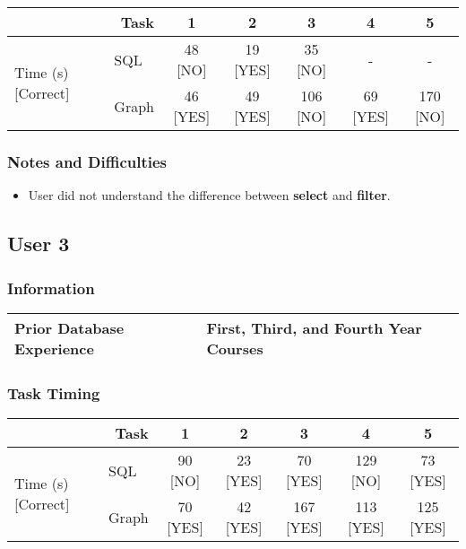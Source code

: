 \begin{tabular}{|l|l|c|c|c|c|c|}
	\hline
	\multicolumn{2}{|r|}{\textbf{Task}} & \textbf{1} & \textbf{2} & \textbf{3} & \textbf{4} & \textbf{5} \\
	\hline
	\multirow{2}{*}{Time (s) [Correct]} & SQL   & 48 [NO]  & 19 [YES] & 35 [NO]  & -   & -   \\
	                                       & Graph & 46 [YES] & 49 [YES] & 106 [NO] & 69 [YES] & 170 [NO] \\
	\hline
\end{tabular}

\subsubsection{Notes and Difficulties}

\begin{itemize}

	\item
	User did not understand the difference between \textbf{select} and \textbf{filter}.

\end{itemize}

\subsection{User 3}

\subsubsection{Information}

\begin{tabular}{|l|l|}
	\hline
	\textbf{Prior Database Experience} & First, Third, and Fourth Year Courses \\
	\hline
\end{tabular}

\subsubsection{Task Timing}

\begin{tabular}{|l|l|c|c|c|c|c|}
	\hline
	\multicolumn{2}{|r|}{\textbf{Task}} & \textbf{1} & \textbf{2} & \textbf{3} & \textbf{4} & \textbf{5} \\
	\hline
	\multirow{2}{*}{Time (s) [Correct]} & SQL   & 90 [NO]  & 23 [YES] & 70 [YES] & 129 [NO]  & 73 [YES]   \\
	                                    & Graph & 70 [YES] & 42 [YES] & 167 [YES] & 113 [YES] & 125 [YES] \\
	\hline
\end{tabular}

